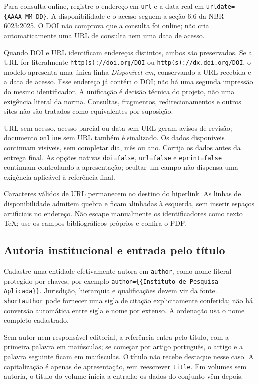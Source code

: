 Para consulta online, registre o endereço em \texttt{url} e a data real em
\mbox{\texttt{urldate=\{AAAA-MM-DD\}}}. A disponibilidade e o acesso seguem a seção
6.6 da NBR 6023:2025. O DOI não comprova que a consulta foi online; não cria
automaticamente uma URL de consulta nem uma data de acesso.

Quando DOI e URL identificam endereços distintos, ambos são preservados.
Se a URL for literalmente \texttt{http(s)://doi.org/DOI} ou
\texttt{http(s)://dx.doi.org/DOI}, o modelo apresenta uma única linha
\emph{Disponível em}, conservando a URL recebida e a data de acesso.
Esse endereço já contém o DOI; não há uma segunda impressão do mesmo
identificador. A unificação é decisão técnica do projeto, não uma exigência
literal da norma. Consultas, fragmentos, redirecionamentos e outros sites
não são tratados como equivalentes por suposição.

URL sem acesso, acesso parcial ou data sem URL geram avisos de revisão;
documento \texttt{online} sem URL também é sinalizado. Os dados disponíveis
continuam visíveis, sem completar dia, mês ou ano. Corrija os dados antes
da entrega final. As opções nativas \texttt{doi=false}, \texttt{url=false}
e \texttt{eprint=false} continuam controlando a apresentação; ocultar um
campo não dispensa uma exigência aplicável à referência final.

Caracteres válidos de URL permanecem no destino do hiperlink. As linhas de
disponibilidade admitem quebra e ficam alinhadas à esquerda, sem inserir
espaços artificiais no endereço. Não escape manualmente os identificadores
como texto TeX; use os campos bibliográficos próprios e confira o PDF.

\subsection*{Autoria institucional e entrada pelo título}

Cadastre uma entidade efetivamente autora em \texttt{author}, como nome
literal protegido por chaves, por exemplo
\verb|author={{Instituto de Pesquisa Aplicada}}|. Jurisdição, hierarquia e
qualificações devem vir da fonte. \texttt{shortauthor} pode fornecer uma
sigla de citação explicitamente conferida; não há conversão automática
entre sigla e nome por extenso. A ordenação usa o nome completo cadastrado.

Sem autor nem responsável editorial, a referência entra pelo título,
com a primeira palavra em maiúsculas; se começar por artigo português,
o artigo e a palavra seguinte ficam em maiúsculas. O título não recebe
destaque nesse caso. A capitalização é apenas de apresentação, sem
reescrever \texttt{title}. Em volumes sem autoria, o título do volume
inicia a entrada; os dados do conjunto vêm depois.

